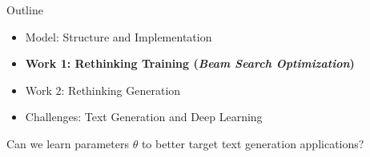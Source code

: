 \begin{frame}{Outline}

  \begin{itemize}
  \item Model: Structure and Implementation
    \air
  \item \textbf{Work 1: Rethinking Training (\textit{Beam Search Optimization})}
    \air

  \item Work 2: Rethinking Generation
    \air

  \item Challenges: Text Generation and Deep Learning
  \end{itemize}

  \begin{center}
    Can we learn parameters $\theta$ to better target text generation
    applications?
  \end{center}


\end{frame}











